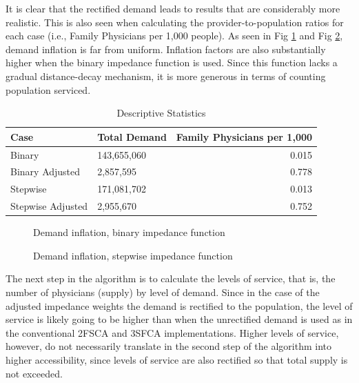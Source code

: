 \documentclass[10pt,letterpaper]{article}
\begin{document}
It is clear that the rectified demand leads to results that are
considerably more realistic. This is also seen when calculating the
provider-to-population ratios for each case (i.e., Family Physicians per
1,000 people). As seen in Fig \ref{fig:fig5-map-demand-inflation-binary}
and Fig \ref{fig:fig6-map-demand-inflation-stepwise}, demand inflation
is far from uniform. Inflation factors are also substantially higher
when the binary impedance function is used. Since this function lacks a
gradual distance-decay mechanism, it is more generous in terms of
counting population serviced.

\begin{table}

\caption{\label{tab:table-descriptive-statistics}\label{tab:table-descriptive-statistics}Descriptive Statistics}
\centering
\begin{tabular}[t]{llr}
\toprule
Case & Total Demand & Family Physicians per 1,000\\
\midrule
Binary & 143,655,060 & 0.015\\
Binary Adjusted & 2,857,595 & 0.778\\
Stepwise & 171,081,702 & 0.013\\
Stepwise Adjusted & 2,955,670 & 0.752\\
\bottomrule
\end{tabular}
\end{table}

\begin{figure}[htbp]
\centering
\caption{\label{fig:fig5-map-demand-inflation-binary}Demand inflation,
binary impedance function}
\end{figure}

\begin{figure}[htbp]
\centering
\caption{\label{fig:fig6-map-demand-inflation-stepwise}Demand inflation,
stepwise impedance function}
\end{figure}

The next step in the algorithm is to calculate the levels of service,
that is, the number of physicians (supply) by level of demand. Since in
the case of the adjusted impedance weights the demand is rectified to
the population, the level of service is likely going to be higher than
when the unrectified demand is used as in the conventional 2FSCA and
3SFCA implementations. Higher levels of service, however, do not
necessarily translate in the second step of the algorithm into higher
accessibility, since levels of service are also rectified so that total
supply is not exceeded.
\end{document}
